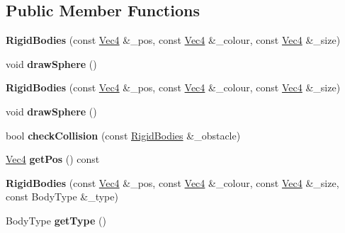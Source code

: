\subsection*{Public Member Functions}
\begin{DoxyCompactItemize}
\item 
\hypertarget{classRigidBodies_a58df3e91c82d5f251743b95060559223}{
{\bfseries RigidBodies} (const \hyperlink{classVec4}{Vec4} \&\_\-pos, const \hyperlink{classVec4}{Vec4} \&\_\-colour, const \hyperlink{classVec4}{Vec4} \&\_\-size)}
\label{classRigidBodies_a58df3e91c82d5f251743b95060559223}

\item 
\hypertarget{classRigidBodies_a5c1853603537bf8397b1c186194da3be}{
void {\bfseries drawSphere} ()}
\label{classRigidBodies_a5c1853603537bf8397b1c186194da3be}

\item 
\hypertarget{classRigidBodies_a58df3e91c82d5f251743b95060559223}{
{\bfseries RigidBodies} (const \hyperlink{classVec4}{Vec4} \&\_\-pos, const \hyperlink{classVec4}{Vec4} \&\_\-colour, const \hyperlink{classVec4}{Vec4} \&\_\-size)}
\label{classRigidBodies_a58df3e91c82d5f251743b95060559223}

\item 
\hypertarget{classRigidBodies_a5c1853603537bf8397b1c186194da3be}{
void {\bfseries drawSphere} ()}
\label{classRigidBodies_a5c1853603537bf8397b1c186194da3be}

\item 
\hypertarget{classRigidBodies_aeb4c0902bde5215f9928f8e2810dd82e}{
bool {\bfseries checkCollision} (const \hyperlink{classRigidBodies}{RigidBodies} \&\_\-obstacle)}
\label{classRigidBodies_aeb4c0902bde5215f9928f8e2810dd82e}

\item 
\hypertarget{classRigidBodies_a7cebe73aed519b306f10b145acaf9696}{
\hyperlink{classVec4}{Vec4} {\bfseries getPos} () const }
\label{classRigidBodies_a7cebe73aed519b306f10b145acaf9696}

\item 
\hypertarget{classRigidBodies_ab2ce43e11e8b52efcd99e5c930857317}{
{\bfseries RigidBodies} (const \hyperlink{classVec4}{Vec4} \&\_\-pos, const \hyperlink{classVec4}{Vec4} \&\_\-colour, const \hyperlink{classVec4}{Vec4} \&\_\-size, const BodyType \&\_\-type)}
\label{classRigidBodies_ab2ce43e11e8b52efcd99e5c930857317}

\item 
\hypertarget{classRigidBodies_a705e61e9256efa76910f976d504394e3}{
BodyType {\bfseries getType} ()}
\label{classRigidBodies_a705e61e9256efa76910f976d504394e3}


\end{DoxyCompactItemize}

